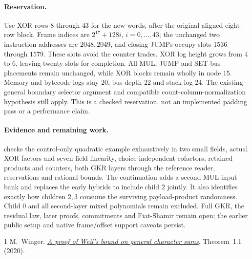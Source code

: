 \documentclass[11pt]{article}
\begin{document}
\paragraph{Reservation.} Use XOR rows $8$ through $43$ for the new words, after the original aligned eight-row block. Frame indices are $2^{17}+128i$, $i=0,\ldots,43$; the unchanged two instruction addresses are $2048,2049$, and closing JUMPs occupy slots $1536$ through $1579$. These slots avoid the counter trades. XOR log height grows from $4$ to $6$, leaving twenty slots for completion. All MUL, JUMP and SET bus placements remain unchanged, while XOR blocks remain wholly in node $15$. Memory and bytecode logs stay $20$, bus depth $22$ and stack log $24$. The existing general boundary selector argument and compatible count-column-normalization hypothesis still apply. This is a checked reservation, not an implemented padding pass or a performance claim.

\paragraph{Evidence and remaining work.}  checks the control-only quadratic example exhaustively in two small fields, actual XOR factors and seven-field linearity, choice-independent cofactors, retained products and counters, both GKR layers through the reference reader, reservations and rational bounds. The continuation  adds a second MUL input bank and replaces the early hybrids to include child $2$ jointly. It also identifies exactly how children $2,3$ consume the surviving payload-product randomness. Child $0$ and all second-layer mixed polynomials remain excluded. Full GKR, the residual law, later proofs, commitments and Fiat-Shamir remain open; the earlier public setup and native frame/offset support caveats persist.

\begin{thebibliography}{1}
 M.~Winger. \href{https://people.math.ethz.ch/~pinkri/Theses/2020-Bachelor-Moritz-Winger.pdf}{\emph{A proof of Weil's bound on general character sums}}, Theorem~1.1 (2020).
\end{thebibliography}
\end{document}
